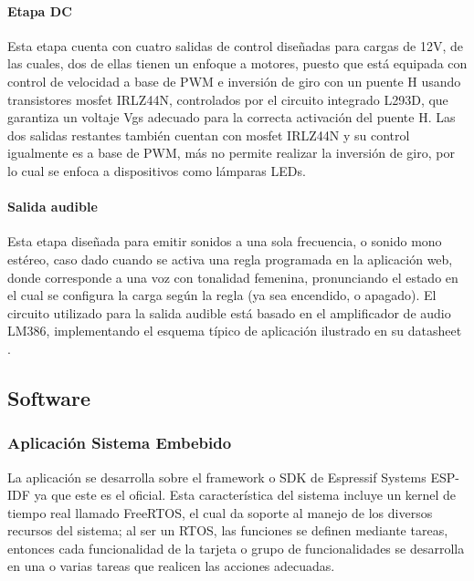 	\paragraph{Etapa DC}
	
		Esta etapa cuenta con cuatro salidas de control diseñadas para cargas de 12V, de las cuales, dos de ellas tienen un enfoque a motores, puesto que está equipada con control de velocidad a base de PWM e inversión de giro con un puente H usando transistores mosfet IRLZ44N, controlados por el circuito integrado L293D, que garantiza un voltaje Vgs adecuado para la correcta activación del puente H. Las dos salidas restantes también cuentan con mosfet IRLZ44N y su control igualmente es a base de PWM, más no permite realizar la inversión de giro, por lo cual se enfoca a dispositivos como lámparas LEDs.
	
	\paragraph{Salida audible}
	
		Esta etapa diseñada para emitir sonidos a una sola frecuencia, o sonido mono estéreo, caso dado cuando se activa una regla programada en la aplicación web, donde corresponde a una voz con tonalidad femenina, pronunciando el estado en el cual se configura la carga según la regla (ya sea encendido, o apagado).	El circuito utilizado para la salida audible está basado en el amplificador de audio LM386, implementando el esquema típico de aplicación ilustrado en su datasheet \cite{LM386}.
				
\subsection{Software}

\subsubsection{Aplicación Sistema Embebido}

La aplicación se desarrolla sobre el framework o SDK de Espressif Systems ESP-IDF \cite{ES} ya que este es el oficial. Esta característica del sistema incluye un kernel de tiempo real llamado FreeRTOS, el cual da soporte al manejo de los diversos recursos del sistema; al ser un RTOS, las funciones se definen mediante tareas, entonces cada funcionalidad de la tarjeta o grupo de funcionalidades se desarrolla en una o varias tareas que realicen las acciones adecuadas.\\

